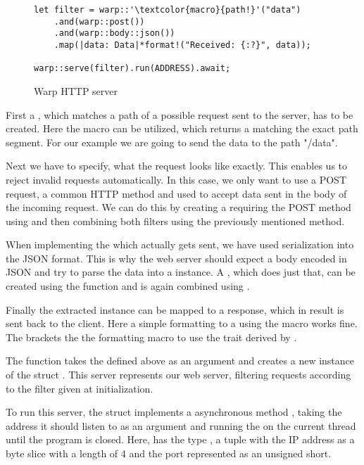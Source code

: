 \begin{figure}[ht]
    \begin{verbatim}
let filter = warp::'\textcolor{macro}{path!}'("data")
    .and(warp::post())
    .and(warp::body::json())
    .map(|data: Data|*format!("Received: {:?}", data));

warp::serve(filter).run(ADDRESS).await;
    \end{verbatim}
    \caption{Warp HTTP server}
    \label{http-server}
\end{figure}

First a , which matches a path of a possible request sent to the server, has to be created. Here the macro
 can be utilized, which returns a  matching the exact path segment. For our
example we are going to send the data to the path "/data".

Next we have to specify, what the request looks like exactly. This enables us to reject invalid requests automatically.
In this case, we only want to use a POST request, a common HTTP method and used to accept data sent in the body of the
incoming request. We can do this by creating a  requiring the POST method using  and
then combining both filters using the previously mentioned  method.

When implementing the  which actually gets sent, we have used serialization into the JSON format. This is
why the web server should expect a body encoded in JSON and try to parse the data into a  instance. A
, which does just that, can be created using the function  and is again combined
using .

Finally the extracted  instance can be mapped to a response, which in result is sent back to the client.
Here a simple formatting to a  using the  macro works fine. The  brackets
the the formatting macro to use the  trait derived by .

The function  takes the  defined above as an argument and creates a new instance of the
struct . This server represents our web server, filtering requests according to the filter given at
initialization.

To run this server, the struct implements a asynchronous method , taking the address it should listen to as
an argument and running the  on the current thread until the program is closed. Here,  has
the type , a tuple with the IP address as a byte slice with a length of 4 and the port represented
as an unsigned short.

